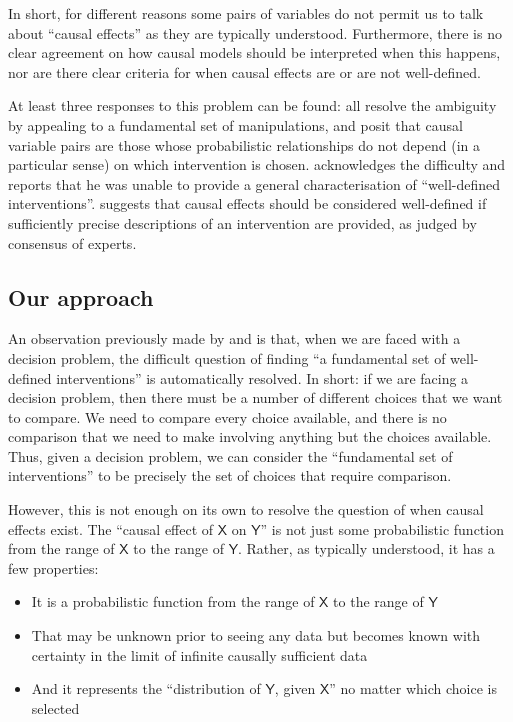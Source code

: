 \documentclass{article}
\theoremstyle{plain}
\theoremstyle{definition}
\newcommand{\RV}[1]{\ensuremath{\mathsf{#1}}}
\begin{document}
In short, for different reasons some pairs of variables do not permit us to talk about ``causal effects'' as they are typically understood. Furthermore, there is no clear agreement on how causal models should be interpreted when this happens, nor are there clear criteria for when causal effects are or are not well-defined.

At least three responses to this problem can be found: \citet{spirtes_causal_2004,eberhardt_contemporary_2022,chalupka_causal_2017} all resolve the ambiguity by appealing to a fundamental set of manipulations, and posit that causal variable pairs are those whose probabilistic relationships do not depend (in a particular sense) on which intervention is chosen. \citet{woodward_causation_2016} acknowledges the difficulty and reports that he was unable to provide a general characterisation of ``well-defined interventions''. \citet{noauthor_does_2016} suggests that causal effects should be considered well-defined if sufficiently precise descriptions of an intervention are provided, as judged by consensus of experts.

\subsection{Our approach}

An observation previously made by \citet{dawid_decision-theoretic_2020} and \citet{heckerman_decision-theoretic_1995} is that, when we are faced with a decision problem, the difficult question of finding ``a fundamental set of well-defined interventions'' is automatically resolved. In short: if we are facing a decision problem, then there must be a number of different choices that we want to compare. We need to compare every choice available, and there is no comparison that we need to make involving anything but the choices available. Thus, given a decision problem, we can consider the ``fundamental set of interventions'' to be precisely the set of choices that require comparison.

However, this is not enough on its own to resolve the question of when causal effects exist. The ``causal effect of $\RV{X}$ on $\RV{Y}$'' is not just some probabilistic function from the range of $\RV{X}$ to the range of $\RV{Y}$. Rather, as typically understood, it has a few properties:

\begin{itemize}
  \item It is a probabilistic function from the range of $\RV{X}$ to the range of $\RV{Y}$
  \item That may be unknown prior to seeing any data but becomes known with certainty in the limit of infinite causally sufficient data
  \item And it represents the ``distribution of $\RV{Y}$, given $\RV{X}$'' no matter which choice is selected
\end{itemize}
\end{document}
